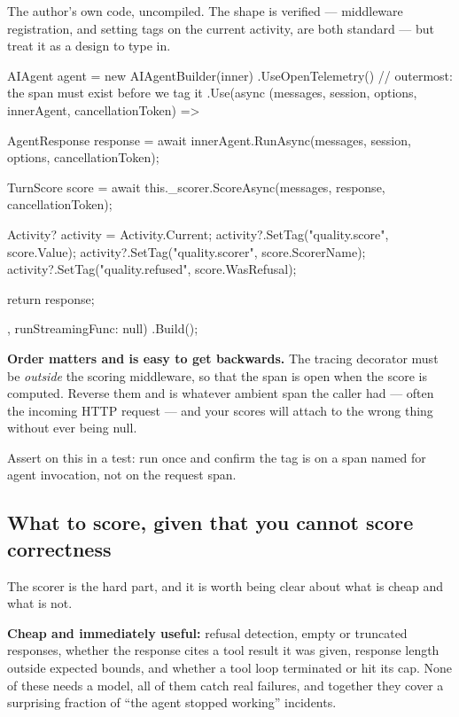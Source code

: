 \begin{verifybox}
The author's own code, uncompiled. The shape is verified --- middleware
registration, and setting tags on the current activity, are both standard --- but
treat it as a design to type in.
\end{verifybox}

\begin{csharp}[caption={A quality score as a span attribute}, label={lst:obs-score}]
AIAgent agent = new AIAgentBuilder(inner)
    .UseOpenTelemetry()   // outermost: the span must exist before we tag it
    .Use(async (messages, session, options, innerAgent, cancellationToken) =>
    {
        AgentResponse response =
            await innerAgent.RunAsync(messages, session, options, cancellationToken);

        TurnScore score = await this._scorer.ScoreAsync(messages, response, cancellationToken);

        Activity? activity = Activity.Current;
        activity?.SetTag("quality.score", score.Value);
        activity?.SetTag("quality.scorer", score.ScorerName);
        activity?.SetTag("quality.refused", score.WasRefusal);

        return response;
    }, runStreamingFunc: null)
    .Build();
\end{csharp}

\begin{warning}
\textbf{Order matters and is easy to get backwards.} The tracing decorator must be
\emph{outside} the scoring middleware, so that the span is open when the score is
computed. Reverse them and  is whatever ambient span the
caller had --- often the incoming HTTP request --- and your scores will attach to
the wrong thing without ever being null.

Assert on this in a test: run once and confirm the tag is on a span named for
agent invocation, not on the request span.
\end{warning}

\subsection{What to score, given that you cannot score correctness}

The scorer is the hard part, and it is worth being clear about what is cheap and
what is not.

\textbf{Cheap and immediately useful:} refusal detection, empty or truncated
responses, whether the response cites a tool result it was given, response length
outside expected bounds, and whether a tool loop terminated or hit its cap. None
of these needs a model, all of them catch real failures, and together they cover
a surprising fraction of ``the agent stopped working'' incidents.

